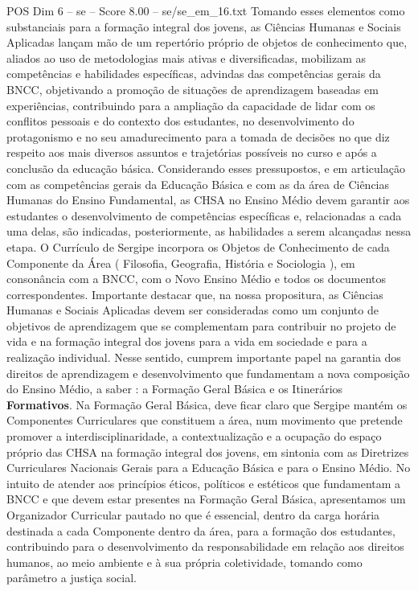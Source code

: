\begin{textsample}{POS Dim 6 – se – Score 8.00 – se/se\_em\_16.txt}
Tomando esses elementos como substanciais para a formação integral dos jovens, as Ciências Humanas e Sociais Aplicadas lançam mão de um repertório próprio de objetos de conhecimento que, aliados ao uso de metodologias mais ativas e diversificadas, mobilizam as competências e habilidades específicas, advindas das competências gerais da BNCC, objetivando a promoção de situações de aprendizagem baseadas em experiências, contribuindo para a ampliação da capacidade de lidar com os conflitos pessoais e do contexto dos estudantes, no desenvolvimento do protagonismo e no seu amadurecimento para a tomada de decisões no que diz respeito aos mais diversos assuntos e trajetórias possíveis no curso e após a conclusão da educação básica.
Considerando esses pressupostos, e em articulação com as competências gerais da Educação Básica e com as da área de Ciências Humanas do Ensino Fundamental, as CHSA no Ensino Médio devem garantir aos estudantes o desenvolvimento de competências específicas e, relacionadas a cada uma delas, são indicadas, posteriormente, as habilidades a serem alcançadas nessa etapa.
O Currículo de Sergipe incorpora os Objetos de Conhecimento de cada Componente da Área ( Filosofia, Geografia, História e Sociologia ), em consonância com a BNCC, com o Novo Ensino Médio e todos os documentos correspondentes.
Importante destacar que, na nossa propositura, as Ciências Humanas e Sociais Aplicadas devem ser consideradas como um conjunto de objetivos de aprendizagem que se complementam para contribuir no projeto de vida e na formação integral dos jovens para a vida em sociedade e para a realização individual.
Nesse sentido, cumprem importante papel na garantia dos direitos de aprendizagem e desenvolvimento que fundamentam a nova composição do Ensino Médio, a saber : a Formação Geral Básica e os Itinerários \textbf{Formativos}.
Na Formação Geral Básica, deve ficar claro que Sergipe mantém os Componentes Curriculares que constituem a área, num movimento que pretende promover a interdisciplinaridade, a contextualização e a ocupação do espaço próprio das CHSA na formação integral dos jovens, em sintonia com as Diretrizes Curriculares Nacionais Gerais para a Educação Básica e para o Ensino Médio.
No intuito de atender aos princípios éticos, políticos e estéticos que fundamentam a BNCC e que devem estar presentes na Formação Geral Básica, apresentamos um Organizador Curricular pautado no que é essencial, dentro da carga horária destinada a cada Componente dentro da área, para a formação dos estudantes, contribuindo para o desenvolvimento da responsabilidade em relação aos direitos humanos, ao meio ambiente e à sua própria coletividade, tomando como parâmetro a justiça social.

\end{textsample}
